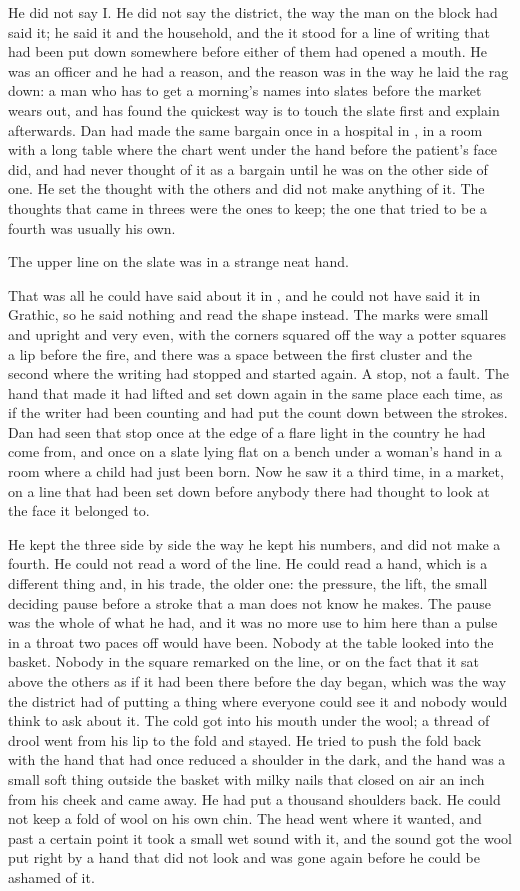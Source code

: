He did not say I. He did not say the district, the way the man on the block had said it; he said it and the household, and the it stood for a line of writing that had been put down somewhere before either of them had opened a mouth. He was an officer and he had a reason, and the reason was in the way he laid the rag down: a man who has to get a morning's names into slates before the market wears out, and has found the quickest way is to touch the slate first and explain afterwards. Dan had made the same bargain once in a hospital in , in a room with a long table where the chart went under the hand before the patient's face did, and had never thought of it as a bargain until he was on the other side of one. He set the thought with the others and did not make anything of it. The thoughts that came in threes were the ones to keep; the one that tried to be a fourth was usually his own.

The upper line on the slate was in a strange neat hand.

That was all he could have said about it in , and he could not have said it in Grathic, so he said nothing and read the shape instead. The marks were small and upright and very even, with the corners squared off the way a potter squares a lip before the fire, and there was a space between the first cluster and the second where the writing had stopped and started again. A stop, not a fault. The hand that made it had lifted and set down again in the same place each time, as if the writer had been counting and had put the count down between the strokes. Dan had seen that stop once at the edge of a flare light in the country he had come from, and once on a slate lying flat on a bench under a woman's hand in a room where a child had just been born. Now he saw it a third time, in a market, on a line that had been set down before anybody there had thought to look at the face it belonged to.

He kept the three side by side the way he kept his numbers, and did not make a fourth. He could not read a word of the line. He could read a hand, which is a different thing and, in his trade, the older one: the pressure, the lift, the small deciding pause before a stroke that a man does not know he makes. The pause was the whole of what he had, and it was no more use to him here than a pulse in a throat two paces off would have been. Nobody at the table looked into the basket. Nobody in the square remarked on the line, or on the fact that it sat above the others as if it had been there before the day began, which was the way the district had of putting a thing where everyone could see it and nobody would think to ask about it. The cold got into his mouth under the wool; a thread of drool went from his lip to the fold and stayed. He tried to push the fold back with the hand that had once reduced a shoulder in the dark, and the hand was a small soft thing outside the basket with milky nails that closed on air an inch from his cheek and came away. He had put a thousand shoulders back. He could not keep a fold of wool on his own chin. The head went where it wanted, and past a certain point it took a small wet sound with it, and the sound got the wool put right by a hand that did not look and was gone again before he could be ashamed of it.

